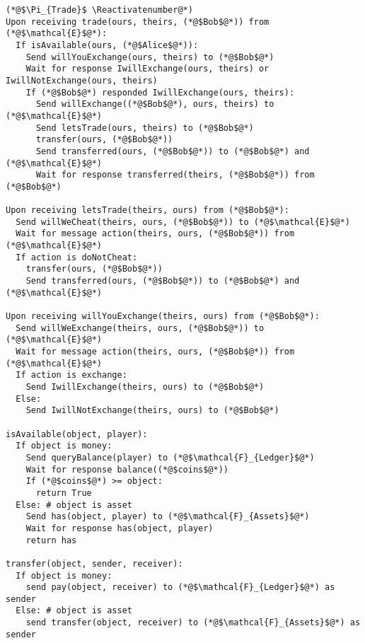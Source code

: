 \Suppressnumber
\begin{lstlisting}[label=tradeprot, style=numbers]
(*@$\Pi_{Trade}$ \Reactivatenumber@*)
Upon receiving trade(ours, theirs, (*@$Bob$@*)) from (*@$\mathcal{E}$@*):
  If isAvailable(ours, (*@$Alice$@*)):
    Send willYouExchange(ours, theirs) to (*@$Bob$@*)
    Wait for response IwillExchange(ours, theirs) or IwillNotExchange(ours, theirs)
    If (*@$Bob$@*) responded IwillExchange(ours, theirs):
      Send willExchange((*@$Bob$@*), ours, theirs) to (*@$\mathcal{E}$@*)
      Send letsTrade(ours, theirs) to (*@$Bob$@*)
      transfer(ours, (*@$Bob$@*))
      Send transferred(ours, (*@$Bob$@*)) to (*@$Bob$@*) and (*@$\mathcal{E}$@*)
      Wait for response transferred(theirs, (*@$Bob$@*)) from (*@$Bob$@*)

Upon receiving letsTrade(theirs, ours) from (*@$Bob$@*):
  Send willWeCheat(theirs, ours, (*@$Bob$@*)) to (*@$\mathcal{E}$@*)
  Wait for message action(theirs, ours, (*@$Bob$@*)) from (*@$\mathcal{E}$@*)
  If action is doNotCheat:
    transfer(ours, (*@$Bob$@*))
    Send transferred(ours, (*@$Bob$@*)) to (*@$Bob$@*) and (*@$\mathcal{E}$@*)

Upon receiving willYouExchange(theirs, ours) from (*@$Bob$@*):
  Send willWeExchange(theirs, ours, (*@$Bob$@*)) to (*@$\mathcal{E}$@*)
  Wait for message action(theirs, ours, (*@$Bob$@*)) from (*@$\mathcal{E}$@*)
  If action is exchange:
    Send IwillExchange(theirs, ours) to (*@$Bob$@*)
  Else:
    Send IwillNotExchange(theirs, ours) to (*@$Bob$@*)

isAvailable(object, player):
  If object is money:
    Send queryBalance(player) to (*@$\mathcal{F}_{Ledger}$@*)
    Wait for response balance((*@$coins$@*))
    If (*@$coins$@*) >= object:
      return True
  Else: # object is asset
    Send has(object, player) to (*@$\mathcal{F}_{Assets}$@*)
    Wait for response has(object, player)
    return has

transfer(object, sender, receiver):
  If object is money:
    send pay(object, receiver) to (*@$\mathcal{F}_{Ledger}$@*) as sender
  Else: # object is asset
    send transfer(object, receiver) to (*@$\mathcal{F}_{Assets}$@*) as sender
\end{lstlisting}

